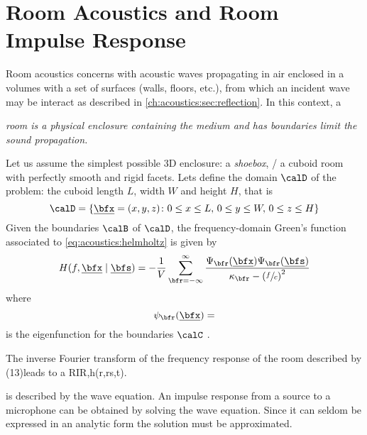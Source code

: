 
\section{Room Acoustics and Room Impulse Response}\label{ch:acoustics:sec:rir}
Room acoustics concerns with acoustic waves propagating in air enclosed in a volumes with a set of surfaces
(walls, floors, etc.), from which an incident wave may be interact as described in \cref{ch:acoustics:sec:reflection}.
In this context, a
\begin{center}
    \textit{\emph{room} is a physical enclosure containing the medium and has boundaries limit the sound propagation.}
\end{center}

Let us assume the simplest possible 3D enclosure: a \textit{shoebox}, \ie/ a cuboid room with perfectly smooth and rigid facets.
Lets define the domain $\calD$ of the problem: the cuboid length $L$, width $W$ and height $H$, that is
\begin{equation}
    \calD = \kset{\positionMicrophone = (x,y,z)}{
        0 \le x \le L,\,
        0 \le y \le W,\,
        0 \le z \le H}
\end{equation}
Given the boundaries $\calB$ of $\calD$, the frequency-domain Green's function associated to \cref{eq:acoustics:helmholtz} is given by
\begin{equation}
    \label{eq:acoustics:greenBounded}
    H(f, \positionMicrophone \mid \positionSource) =
        - \frac{1}{V}
        \sum_{\pos=-\infty}^{\infty}
        \frac{\Psi_{\pos}(\positionMicrophone)\Psi_{\pos}(\positionSource)}{\kappa_{\pos} - \kparen{\sfrac{f}{c}}^2}
\end{equation}
where
\begin{equation}
    \psi_{\pos}(\positionMicrophone) =
\end{equation}
is the eigenfunction for the boundaries $\calC$ \citeauthor{kuttruff2016room}.

The inverse Fourier transform of the frequency response of the room described by (13)leads to a RIR,h(r,rs,t).

 is described by the wave equation.
An impulse response from a source to a microphone can be obtained by solving the wave equation.
Since it can seldom be expressed in an analytic form the solution must be approximated.

